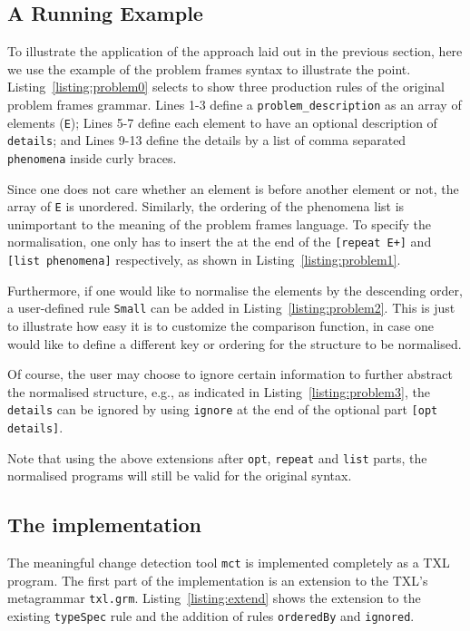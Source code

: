 \documentclass[10pt, conference, compsocconf]{IEEEtran}
\begin{document}
\subsection{A Running Example}\label{sec:example}
To illustrate the application of the approach laid out in the previous section, here we use the example of the problem frames syntax to illustrate the point. Listing~\ref{listing:problem0} selects to show three production rules of the original problem frames grammar. Lines 1-3 define a {\tt problem\_description} as an array of elements ({\tt E}); Lines 5-7 define each element to have an optional description of {\tt details}; and Lines 9-13 define the details by a list of comma separated {\tt phenomena} inside curly braces. 

Since one does not care whether an element is before another element or not, the array of {\tt E}  is unordered. Similarly, the ordering of the phenomena list is unimportant to the meaning of the problem frames language. To specify the normalisation, one only has to insert the  at the end of the {\tt [repeat E+]} and {\tt [list phenomena]} respectively, as shown in Listing~\ref{listing:problem1}.

Furthermore, if one would like to normalise the elements by the descending order, a user-defined rule {\tt Small} can be added in Listing~\ref{listing:problem2}. This is just to illustrate how easy it is to customize the comparison function, in case one would like to define a different key or ordering for the structure to be normalised.

Of course, the user may choose to ignore certain information to further abstract the normalised structure, e.g., as indicated in Listing~\ref{listing:problem3}, the {\tt details} can be ignored by using {\tt ignore} at the end of the optional part {\tt [opt details]}. 

Note that using the above extensions after {\tt opt}, {\tt repeat} and {\tt list} parts, the normalised programs will still be valid for the original syntax.

\subsection{The implementation}
The meaningful change detection tool {\tt mct} is implemented completely as a TXL program. The first part of the implementation is an extension to the TXL's metagrammar {\tt txl.grm}. Listing~\ref{listing:extend} shows the extension to the existing {\tt typeSpec} rule and the addition of rules {\tt orderedBy} and {\tt ignored}.

 
\end{document}
